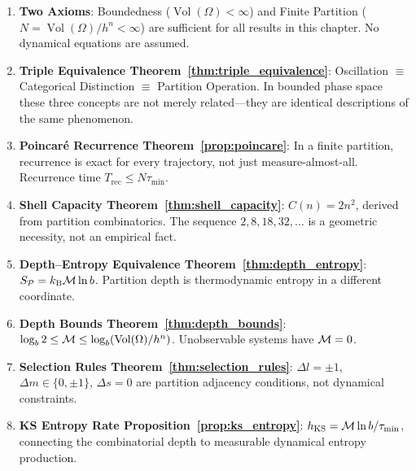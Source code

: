 \begin{chapterbox}[title=Chapter 1 — Key Results Established]
\begin{enumerate}[label=\textbf{\arabic*.}]
  \item \textbf{Two Axioms}: Boundedness ($\operatorname{Vol}(\Omega) < \infty$)
        and Finite Partition ($N = \operatorname{Vol}(\Omega)/h^n < \infty$)
        are sufficient for all results in this chapter. No dynamical equations
        are assumed.

  \item \textbf{Triple Equivalence Theorem~\ref{thm:triple_equivalence}}:
        Oscillation $\equiv$ Categorical Distinction $\equiv$ Partition Operation.
        In bounded phase space these three concepts are not merely related---they
        are identical descriptions of the same phenomenon.

  \item \textbf{Poincar\'{e} Recurrence Theorem~\ref{prop:poincare}}:
        In a finite partition, recurrence is exact for every trajectory,
        not just measure-almost-all. Recurrence time $T_{\mathrm{rec}} \leq N\tau_{\min}$.

  \item \textbf{Shell Capacity Theorem~\ref{thm:shell_capacity}}:
        $C(n) = 2n^2$, derived from partition combinatorics. The sequence
        $2, 8, 18, 32, \ldots$ is a geometric necessity, not an empirical fact.

  \item \textbf{Depth--Entropy Equivalence Theorem~\ref{thm:depth_entropy}}:
        $S_{\mathcal{P}} = k_{\mathrm{B}} \mathcal{M} \ln b$. Partition depth is thermodynamic
        entropy in a different coordinate.

  \item \textbf{Depth Bounds Theorem~\ref{thm:depth_bounds}}:
        $\log_b 2 \leq \mathcal{M} \leq \log_b(\operatorname{Vol}(\Omega)/h^n)$.
        Unobservable systems have $\mathcal{M} = 0$.

  \item \textbf{Selection Rules Theorem~\ref{thm:selection_rules}}:
        $\Delta l = \pm 1$, $\Delta m \in \{0,\pm 1\}$, $\Delta s = 0$
        are partition adjacency conditions, not dynamical constraints.

  \item \textbf{KS Entropy Rate Proposition~\ref{prop:ks_entropy}}:
        $h_{\mathrm{KS}} = \mathcal{M} \ln b / \tau_{\min}$, connecting the
        combinatorial depth to measurable dynamical entropy production.


\end{enumerate}
\end{chapterbox}

